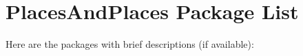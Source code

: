 \section{Places\-And\-Places Package List}
Here are the packages with brief descriptions (if available):\begin{CompactList}
\item{}
\end{CompactList}
